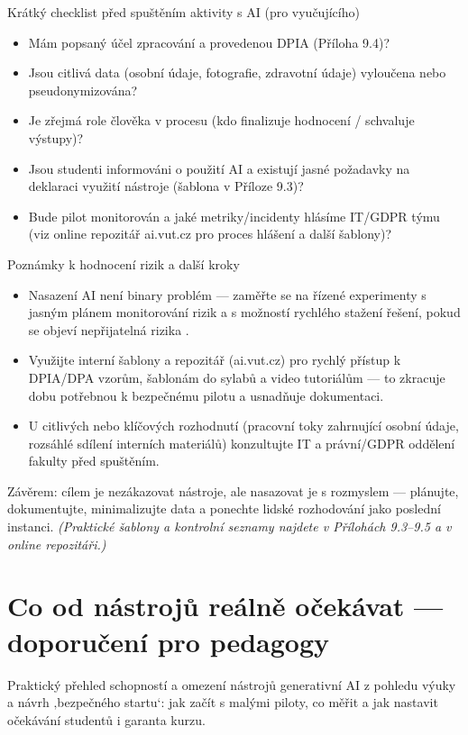 \documentclass{report}%
\begin{document}
Krátký checklist před spuštěním aktivity s AI (pro vyučujícího)
\begin{itemize}
  \item Mám popsaný účel zpracování a provedenou DPIA (Příloha 9.4)? \\
  \item Jsou citlivá data (osobní údaje, fotografie, zdravotní údaje) vyloučena nebo pseudonymizována? \\
  \item Je zřejmá role člověka v procesu (kdo finalizuje hodnocení / schvaluje výstupy)? \cite{kb_ai_101_tipu_pdf_04e4a115_page_8_1} \\
  \item Jsou studenti informováni o použití AI a existují jasné požadavky na deklaraci využití nástroje (šablona v Příloze 9.3)? \\
  \item Bude pilot monitorován a jaké metriky/incidenty hlásíme IT/GDPR týmu (viz online repozitář ai.vut.cz pro proces hlášení a další šablony)? 
\end{itemize}

Poznámky k hodnocení rizik a další kroky
\begin{itemize}
  \item Nasazení AI není binary problém — zaměřte se na řízené experimenty s jasným plánem monitorování rizik a s možností rychlého stažení řešení, pokud se objeví nepřijatelná rizika \cite{kb_malinka_chatgpt_ve_vyuce_dva_roky_pote_2024_pdf_90bc3aaf_page_12_1}.
  \item Využijte interní šablony a repozitář (ai.vut.cz) pro rychlý přístup k DPIA/DPA vzorům, šablonám do sylabů a video tutoriálům — to zkracuje dobu potřebnou k bezpečnému pilotu a usnadňuje dokumentaci.
  \item U citlivých nebo klíčových rozhodnutí (pracovní toky zahrnující osobní údaje, rozsáhlé sdílení interních materiálů) konzultujte IT a právní/GDPR oddělení fakulty před spuštěním.
\end{itemize}

Závěrem: cílem je nezákazovat nástroje, ale nasazovat je s rozmyslem — plánujte, dokumentujte, minimalizujte data a ponechte lidské rozhodování jako poslední instanci. \emph{(Praktické šablony a kontrolní seznamy najdete v Přílohách 9.3–9.5 a v online repozitáři.)}%

%
\section{Co od nástrojů reálně očekávat — doporučení pro pedagogy}%
Praktický přehled schopností a omezení nástrojů generativní AI z pohledu výuky a návrh ‚bezpečného startu‘: jak začít s malými piloty, co měřit a jak nastavit očekávání studentů i garanta kurzu.%
\end{document}
